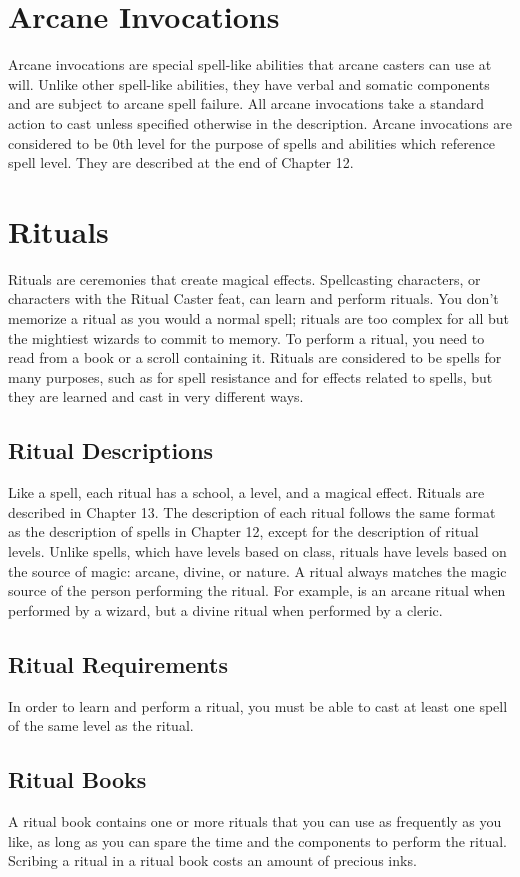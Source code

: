 \section{Arcane Invocations}\label{Arcane Invocations}
Arcane invocations are special spell-like abilities that arcane casters can use at will. Unlike other spell-like abilities, they have verbal and somatic components and are subject to arcane spell failure. All arcane invocations take a standard action to cast unless specified otherwise in the description. Arcane invocations are considered to be 0th level for the purpose of spells and abilities which reference spell level. They are described at the end of Chapter 12.

\section{Rituals}\label{Rituals}
Rituals are ceremonies that create magical effects. Spellcasting characters, or characters with the Ritual Caster feat, can learn and perform rituals. You don't memorize a ritual as you would a normal spell; rituals are too complex for all but the mightiest wizards to commit to memory. To perform a ritual, you need to read from a book or a scroll containing it. Rituals are considered to be spells for many purposes, such as for spell resistance and for effects related to spells, but they are learned and cast in very different ways.
\subsection{Ritual Descriptions}
\par Like a spell, each ritual has a school, a level, and a magical effect. Rituals are described in Chapter 13. The description of each ritual follows the same format as the description of spells in Chapter 12, except for the description of ritual levels. Unlike spells, which have levels based on class, rituals have levels based on the source of magic: arcane, divine, or nature. A ritual always matches the magic source of the person performing the ritual. For example,  is an arcane ritual when performed by a wizard, but a divine ritual when performed by a cleric.
\subsection{Ritual Requirements} In order to learn and perform a ritual, you must be able to cast at least one spell of the same level as the ritual.
\subsection{Ritual Books}
A ritual book contains one or more rituals that you can use as frequently as you like, as long as you can spare the time and the components to perform the ritual. Scribing a ritual in a ritual book costs an amount of precious inks.
